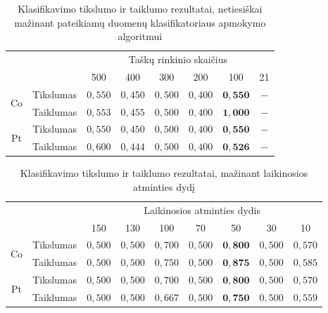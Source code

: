\documentclass[]{vgtuef}
\begin{document}
\begin{table}
	\centering
	\renewcommand{\arraystretch}{1.3}
	\caption{Klasifikavimo tikslumo ir taiklumo rezultatai, netiesiškai mažinant pateikiamų duomenų klasifikatoriaus apmokymo algoritmui}
	\label{table:second_phase_not_linear_experiment}
	\begin{tabular}{|c|c|c|c|c|c|c|c|} \hline
			& & \multicolumn{6}{c|}{Taškų rinkinio skaičius} \\ \cline{3-8}
						&	& 500 	& 400	& 300 	& 200 & 100 	& 21 	\\ \hline
		\multirow{2}{*}{Co}
		& Tikslumas	& $0,550$ & $0,450$ & $0,500$ & $0,400$ & $\mathbf{0,550}$ & $-$ \\ \cline{2-8}
		& Taiklumas  &	$0,553$ & $0,455$ & $0,500$ & $0,400$ & $\mathbf{1,000}$ & $-$ \\ \hline
		\multirow{2}{*}{Pt}
		& Tikslumas	& $0,550$ & $0,450$ & $0,500$ & $0,400$ & $\mathbf{0,550}$ & $-$ \\ \cline{2-8}
		& Taiklumas  &	$0,600$ & $0,444$ & $0,500$ & $0,400$ & $\mathbf{0,526}$ & $-$ \\ \hline
	\end{tabular}
\end{table}

\begin{table}
	\centering
	\renewcommand{\arraystretch}{1.3}
	\caption{Klasifikavimo tikslumo ir taiklumo rezultatai, mažinant laikinosios atminties dydį}
	\label{table:memory_linear_experiment}
	\begin{tabular}{|c|c|c|c|c|c|c|c|c|} \hline
			& & \multicolumn{7}{c|}{Laikinosios atminties dydis} \\ \cline{3-9}
						&	& 150 & 130 & 100 & 70 & 50 & 30 & 10\\ \hline
		\multirow{2}{*}{Co}
		& Tikslumas	& $0,500$ & $0,500$ & $0,700$ & $0,500$ & $\mathbf{0,800}$ & $0,500$ & $0,570$ \\ \cline{2-9}
		& Taiklumas  &	$0,500$ & $0,500$ & $0,750$ & $0,500$ & $\mathbf{0,875}$ & $0,500$ & $0,585$ \\ \hline
		\multirow{2}{*}{Pt}
		& Tikslumas	& $0,500$ & $0,500$ & $0,700$ & $0,500$ & $\mathbf{0,800}$ & $0,500$ & $0,570$ \\ \cline{2-9}
		& Taiklumas  &	$0,500$ & $0,500$ & $0,667$ & $0,500$ & $\mathbf{0,750}$ & $0,500$ & $0,559$ \\ \hline
	\end{tabular}
\end{table}
\end{document}
